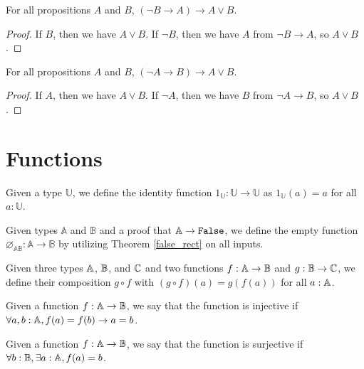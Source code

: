 \documentclass[../../math.tex]{subfiles}
\begin{document}
\begin{theorem} \label{or_left}
    For all propositions $A$ and $B$, $(\neg B \to A) \to A \vee B$.
\end{theorem}
\begin{proof}
    If $B$, then we have $A \vee B$.  If $\neg B$, then we have $A$ from $\neg B
    \to A$, so $A \vee B$.
\end{proof}

\begin{theorem} \label{or_right}
    For all propositions $A$ and $B$, $(\neg A \to B) \to A \vee B$.
\end{theorem}
\begin{proof}
    If $A$, then we have $A \vee B$.  If $\neg A$, then we have $B$ from $\neg A
    \to B$, so $A \vee B$.
\end{proof}

\section{Functions}

\begin{definition}
    Given a type $\mathbb U$, we define the identity function $1_\mathbb U :
    \mathbb U \rightarrow \mathbb U$ as $1_\mathbb U(a) = a$ for all $a :
    \mathbb U$.
\end{definition}

\begin{definition}
    Given types $\mathbb A$ and $\mathbb B$ and a proof that $\mathbb A
    \rightarrow \vtt{False}$, we define the empty function $\varnothing_{\mathbb
    A \mathbb B} : \mathbb A \rightarrow \mathbb B$ by utilizing Theorem
    \ref{false_rect} on all inputs.
\end{definition}

\begin{definition}
    Given three types $\mathbb{A}$, $\mathbb{B}$, and $\mathbb{C}$ and two functions $f : \mathbb{A} \rightarrow
    \mathbb{B}$ and $g : \mathbb{B} \rightarrow \mathbb{C}$, we define their composition $g \circ f$
    with $(g \circ f)(a) = g(f(a))$ for all $a : \mathbb{A}$.
\end{definition}

\begin{class}
    Given a function $f : \mathbb{A} \rightarrow \mathbb{B}$, we say that the function is
    injective if $\forall a, b : \mathbb{A}, f(a) = f(b) \rightarrow a = b$.
\end{class}

\begin{class}
    Given a function $f : \mathbb{A} \rightarrow \mathbb{B}$, we say that the function is
    surjective if $\forall b : \mathbb{B}, \exists a : \mathbb{A}, f(a) = b$.
\end{class}
\end{document}
